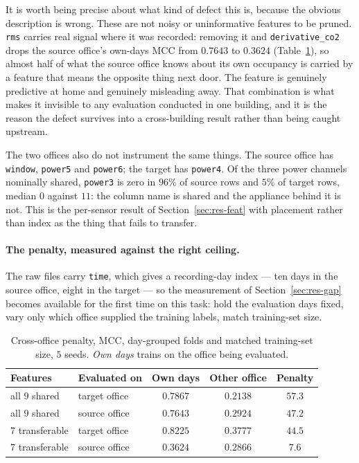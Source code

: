 It is worth being precise about what kind of defect this is, because the obvious
description is wrong. These are not noisy or uninformative features to be pruned.
\texttt{rms} carries real signal where it was recorded: removing it and
\texttt{derivative\_co2} drops the source office's own-days MCC from $0.7643$ to $0.3624$
(Table~\ref{tab:occpenalty}), so almost half of what the source office knows about its own
occupancy is carried by a feature that means the opposite thing next door. The feature is
genuinely predictive at home and genuinely misleading away. That combination is what makes
it invisible to any evaluation conducted in one building, and it is the reason the defect
survives into a cross-building result rather than being caught upstream.

The two offices also do not instrument the same things. The source office has
\texttt{window}, \texttt{power5} and \texttt{power6}; the target has \texttt{power4}. Of
the three power channels nominally shared, \texttt{power3} is zero in $96\%$ of source
rows and $5\%$ of target rows, median $0$ against $11$: the column name is shared and the
appliance behind it is not. This is the per-sensor result of
Section~\ref{sec:res-feat} with placement rather than index as the thing that fails to
transfer.

\paragraph{The penalty, measured against the right ceiling.} The raw files carry
\texttt{time}, which gives a recording-day index --- ten days in the source office, eight
in the target --- so the measurement of Section~\ref{sec:res-gap} becomes available for
the first time on this task: hold the evaluation days fixed, vary only which office
supplied the training labels, match training-set size.

\begin{table}[t]
\centering
\caption{Cross-office penalty, MCC, day-grouped folds and matched training-set size,
$5$ seeds. \emph{Own days} trains on the office being evaluated.}
\label{tab:occpenalty}
\small
\begin{tabular}{@{}llccc@{}}
\toprule
Features & Evaluated on & Own days & Other office & Penalty \\
\midrule
all $9$ shared & target office & $0.7867$ & $0.2138$ & $57.3$ \\
all $9$ shared & source office & $0.7643$ & $0.2924$ & $47.2$ \\
\addlinespace[2pt]
$7$ transferable & target office & $0.8225$ & $0.3777$ & $44.5$ \\
$7$ transferable & source office & $0.3624$ & $0.2866$ & $\mathbf{7.6}$ \\
\bottomrule
\end{tabular}
\end{table}

